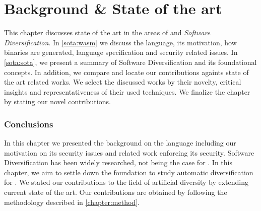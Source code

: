 \chapter{Background \& State of the art}

This chapter discusses state of the art in the areas of \emph{\wasm} and \emph{Software Diversification}. In \autoref{sota:wasm} we discuss the \wasm language, its motivation, how \wasm binaries are generated, language specification and security related issues. In \autoref{sota:sota}, we present a summary of Software Diversification and its foundational concepts. In addition, we compare and locate our contributions againts state of the art related works.  
We select the discussed works by their novelty, critical insights and representativeness of their used techniques. 
We finalize the chapter by stating our novel contributions. 







\subsection*{Conclusions}
In this chapter we presented the background on the \wasm language including our motivation on its security issues and related work enforcing its security.
Software Diversification has been widely researched, not being the case for \wasm. In this chapter, we aim to settle down the foundation to study automatic diversification for \wasm. We stated our contributions to the field of artificial diversity by extending current state of the art. 
Our contributions are obtained by following the methodology described in \autoref{chapter:method}. 
